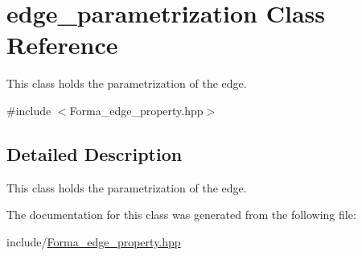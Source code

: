 \hypertarget{classedge__parametrization}{
\section{edge\_\-parametrization Class Reference}
\label{classedge__parametrization}
}


This class holds the parametrization of the edge.  


{\ttfamily \#include $<$Forma\_\-edge\_\-property.hpp$>$}

\subsection{Detailed Description}
This class holds the parametrization of the edge. 

The documentation for this class was generated from the following file:\begin{DoxyCompactItemize}
\item 
include/\hyperlink{Forma__edge__property_8hpp}{Forma\_\-edge\_\-property.hpp}\end{DoxyCompactItemize}
